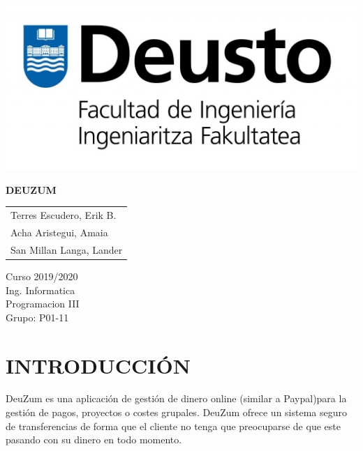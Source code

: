 \documentclass{article}
\theoremstyle{definition}
\begin{document}
\begin{titlepage}
	\begin{center}
	    \includegraphics[scale = 0.5]{LogoIngenieriaR.jpg}\\[1.0 cm]
	\end{center}
	
    \vspace*{150pt}
    \centering
    {\Huge
     \textbf{DEUZUM}
    }
    
	\vspace*{200pt}
	
	
	\begin{minipage}{2in}
		\begin{tabular}{l}
			Terres Escudero, Erik B.    \\
			Acha Aristegui, Amaia  \\
			San Millan Langa, Lander 
		\end{tabular}
	\end{minipage}
	\hfill
	\begin{minipage}{3in}
	\begin{flushright}
	 Curso 2019/2020 \\
		\LARGE Ing. Informatica\\
		\Large Programacion III \\
		Grupo: P01-11
		
	\end{flushright}
		
	\end{minipage}
    
	
\end{titlepage}


\section{INTRODUCCIÓN}


DeuZum es una aplicación de gestión de dinero online (similar a Paypal)para la gestión de pagos, proyectos o costes grupales. DeuZum ofrece un sistema seguro de transferencias de forma que el cliente no tenga que preocuparse de que este pasando con su dinero en todo momento. 
\end{document}
